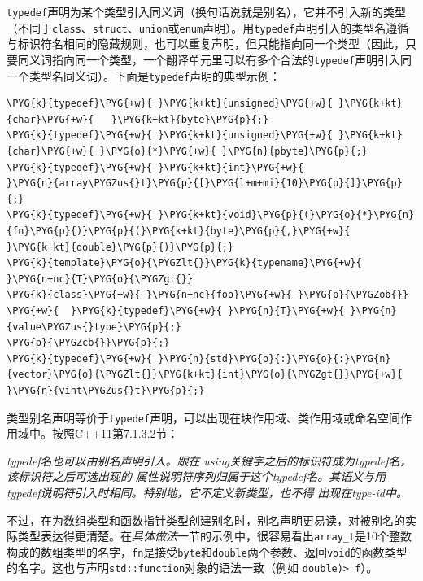 
\texttt{typedef}声明为某个类型引入同义词（换句话说就是别名），它并不引入新的类型（不同于\texttt{class}、\texttt{struct}、\texttt{union}或\texttt{enum}声明）。用\texttt{typedef}声明引入的类型名遵循与标识符名相同的隐藏规则，也可以重复声明，但只能指向同一个类型（因此，只要同义词指向同一个类型，一个翻译单元里可以有多个合法的\texttt{typedef}声明引入同一个类型名同义词）。下面是\texttt{typedef}声明的典型示例：



\begin{codeblockbg}
\begin{Verbatim}[commandchars=\\\{\},breaklines=true,breakanywhere=true,fontsize=\codefont,xleftmargin=17bp]
\PYG{k}{typedef}\PYG{+w}{ }\PYG{k+kt}{unsigned}\PYG{+w}{ }\PYG{k+kt}{char}\PYG{+w}{   }\PYG{k+kt}{byte}\PYG{p}{;}
\PYG{k}{typedef}\PYG{+w}{ }\PYG{k+kt}{unsigned}\PYG{+w}{ }\PYG{k+kt}{char}\PYG{+w}{ }\PYG{o}{*}\PYG{+w}{ }\PYG{n}{pbyte}\PYG{p}{;}
\PYG{k}{typedef}\PYG{+w}{ }\PYG{k+kt}{int}\PYG{+w}{             }\PYG{n}{array\PYGZus{}t}\PYG{p}{[}\PYG{l+m+mi}{10}\PYG{p}{]}\PYG{p}{;}
\PYG{k}{typedef}\PYG{+w}{ }\PYG{k+kt}{void}\PYG{p}{(}\PYG{o}{*}\PYG{n}{fn}\PYG{p}{)}\PYG{p}{(}\PYG{k+kt}{byte}\PYG{p}{,}\PYG{+w}{ }\PYG{k+kt}{double}\PYG{p}{)}\PYG{p}{;}
\PYG{k}{template}\PYG{o}{\PYGZlt{}}\PYG{k}{typename}\PYG{+w}{ }\PYG{n+nc}{T}\PYG{o}{\PYGZgt{}}
\PYG{k}{class}\PYG{+w}{ }\PYG{n+nc}{foo}\PYG{+w}{ }\PYG{p}{\PYGZob{}}
\PYG{+w}{  }\PYG{k}{typedef}\PYG{+w}{ }\PYG{n}{T}\PYG{+w}{ }\PYG{n}{value\PYGZus{}type}\PYG{p}{;}
\PYG{p}{\PYGZcb{}}\PYG{p}{;}
\PYG{k}{typedef}\PYG{+w}{ }\PYG{n}{std}\PYG{o}{:}\PYG{o}{:}\PYG{n}{vector}\PYG{o}{\PYGZlt{}}\PYG{k+kt}{int}\PYG{o}{\PYGZgt{}}\PYG{+w}{ }\PYG{n}{vint\PYGZus{}t}\PYG{p}{;}
\end{Verbatim}
\end{codeblockbg}



类型别名声明等价于\texttt{typedef}声明，可以出现在块作用域、类作用域或命名空间作用域中。按照C++11第7.1.3.2节：



\textit{typedef名也可以由别名声明引入。跟在} \textit{using关键字之后的标识符成为typedef名，该标识符之后可选出现的} \textit{属性说明符序列归属于这个typedef名。其语义与用} \textit{typedef说明符引入时相同。特别地，它不定义新类型，也不得} \textit{出现在type-id中。}



不过，在为数组类型和函数指针类型创建别名时，别名声明更易读，对被别名的实际类型表达得更清楚。在\textit{具体做法}一节的示例中，很容易看出\texttt{array\_\allowbreak{}t}是10个整数构成的数组类型的名字，\texttt{fn}是接受\texttt{byte}和\texttt{double}两个参数、返回\texttt{void}的函数类型的名字。这也与声明\texttt{std::\allowbreak{}function}对象的语法一致（例如 \texttt{double)> f}）。


